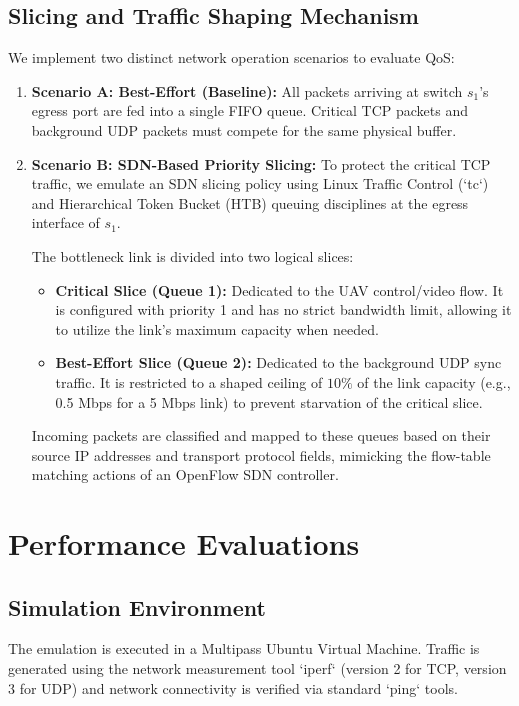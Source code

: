 \documentclass[conference]{IEEEtran}
\begin{document}
\subsection{Slicing and Traffic Shaping Mechanism}
We implement two distinct network operation scenarios to evaluate QoS:
\begin{enumerate}
    \item \textbf{Scenario A: Best-Effort (Baseline):} All packets arriving at switch $s_1$'s egress port are fed into a single FIFO queue. Critical TCP packets and background UDP packets must compete for the same physical buffer.
    \item \textbf{Scenario B: SDN-Based Priority Slicing:} To protect the critical TCP traffic, we emulate an SDN slicing policy using Linux Traffic Control (`tc`) and Hierarchical Token Bucket (HTB) queuing disciplines at the egress interface of $s_1$. 
    
    The bottleneck link is divided into two logical slices:
    \begin{itemize}
        \item \textbf{Critical Slice (Queue 1):} Dedicated to the UAV control/video flow. It is configured with priority 1 and has no strict bandwidth limit, allowing it to utilize the link's maximum capacity when needed.
        \item \textbf{Best-Effort Slice (Queue 2):} Dedicated to the background UDP sync traffic. It is restricted to a shaped ceiling of $10\%$ of the link capacity (e.g., 0.5 Mbps for a 5 Mbps link) to prevent starvation of the critical slice.
    \end{itemize}
    Incoming packets are classified and mapped to these queues based on their source IP addresses and transport protocol fields, mimicking the flow-table matching actions of an OpenFlow SDN controller.
\end{enumerate}

\section{Performance Evaluations}

\subsection{Simulation Environment}
The emulation is executed in a Multipass Ubuntu Virtual Machine. Traffic is generated using the network measurement tool `iperf` (version 2 for TCP, version 3 for UDP) and network connectivity is verified via standard `ping` tools. 
\end{document}
